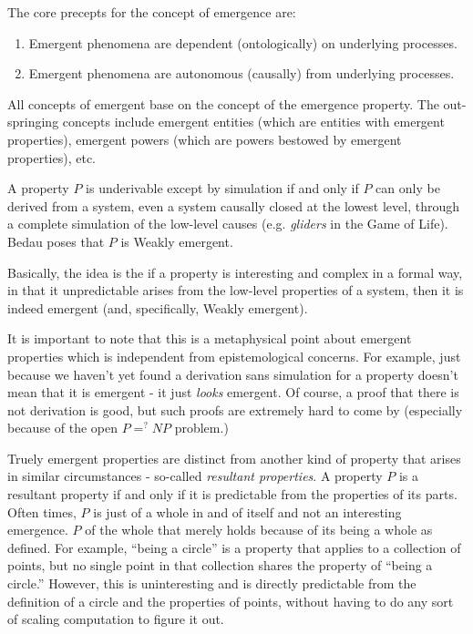 \documentclass{article}
\newcommand{\ti}[1]{\textit{#1}}
\begin{document}
The core precepts for the concept of emergence are:
\begin{enumerate}
    \item Emergent phenomena are dependent (ontologically) on underlying processes.
    \item Emergent phenomena are autonomous (causally) from underlying processes.
\end{enumerate}

All concepts of emergent base on the concept of the emergence property. The out-springing concepts include emergent entities (which are entities with emergent properties), emergent powers (which are powers bestowed by emergent properties), etc.

A property $P$ is underivable except by simulation if and only if $P$ can only be derived from a system, even a system causally closed at the lowest level, through a complete simulation of the low-level causes (e.g. \ti{gliders} in the Game of Life). Bedau poses that $P$ is Weakly emergent.

Basically, the idea is the if a property is interesting and complex in a formal way, in that it unpredictable arises from the low-level properties of a system, then it is indeed emergent (and, specifically, Weakly emergent).

It is important to note that this is a metaphysical point about emergent properties which is independent from epistemological concerns. For example, just because we haven't yet found a derivation sans simulation for a property doesn't mean that it is emergent - it just \ti{looks} emergent. Of course, a proof that there is not derivation is good, but such proofs are extremely hard to come by (especially because of the open $P =^? NP$ problem.)

Truely emergent properties are distinct from another kind of property that arises in similar circumstances - so-called \ti{resultant properties}. A property $P$ is a resultant property if and only if it is predictable from the properties of its parts. Often times, $P$ is just of a whole in and of itself and not an interesting emergence. $P$ of the whole that merely holds because of its being a whole as defined. For example, ``being a circle'' is a property that applies to a collection of points, but no single point in that collection shares the property of ``being a circle.'' However, this is uninteresting and is directly predictable from the definition of a circle and the properties of points, without having to do any sort of scaling computation to figure it out.
\end{document}
